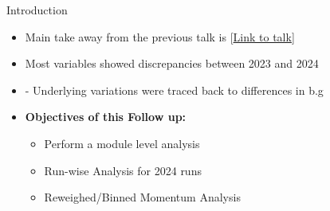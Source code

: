 \begin{frame}{Introduction}
    \begin{itemize}
        \small
        \item Main take away from the previous talk is [\href{https://indico.cern.ch/event/1488927/}{Link to talk}]
        \item Most variables showed discrepancies between 2023 and 2024
        \item[] - Underlying variations were traced back to differences in b.g
        \vspace{0.5cm}
        \item \textbf{Objectives of this Follow up:}
        \begin{itemize}
            \item Perform a module level analysis
            \item Run-wise Analysis for 2024 runs
            \item Reweighed/Binned Momentum Analysis
        \end{itemize}

    \end{itemize}    
\end{frame}


